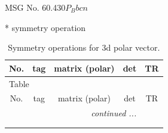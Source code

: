 \documentclass[fleqn,8pt]{jsarticle}
\begin{document}
\setcounter{MaxMatrixCols}{32}

\renewcommand{\tablename}{Table~}
\renewcommand{\figurename}{Figure~}
\begin{center}
\LARGE
MSG No. 60.430\quad$P_{B}bcn$
\end{center}
* symmetry operation
\renewcommand{\arraystretch}{1.3}
\begin{longtable}{ccccc}
\caption{Symmetry operations for 3d polar vector.}
 \\
 \hline \hline
No. & tag & matrix (polar) & det & TR \\ \hline \endfirsthead

\multicolumn{4}{l}{\tablename\ \thetable{}} \\
 \hline \hline
No. & tag & matrix (polar) & det & TR \\ \hline \endhead

 \hline \hline
\multicolumn{4}{r}{\footnotesize\it continued ...} \\ \endfoot

 \hline \hline
\multicolumn{4}{r}{} \\ \endlastfoot


\end{longtable}
\end{document}
